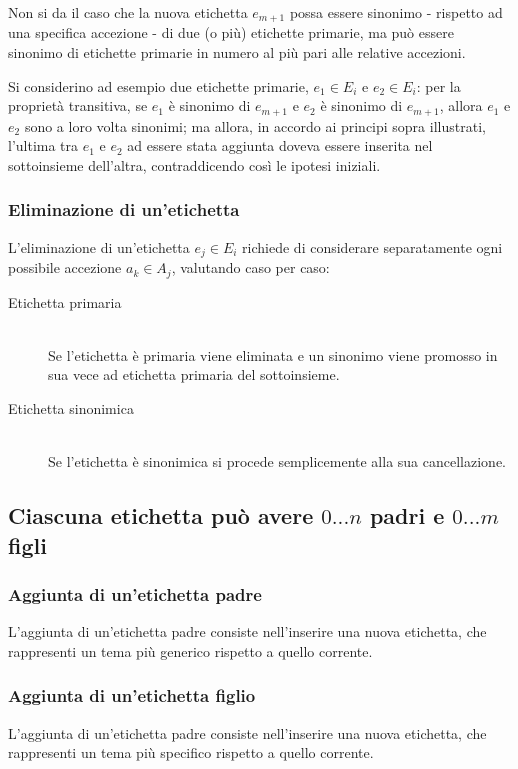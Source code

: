\documentclass[10pt,a4paper,headinclude,footinclude,hidelinks]{scrreprt} %
\begin{document}
	Non si da il caso che la nuova etichetta $e_{m+1}$ possa essere sinonimo - rispetto ad una specifica accezione - di due (o più) etichette primarie, ma può essere sinonimo di etichette primarie in numero al più pari alle relative accezioni.

	Si considerino ad esempio due etichette primarie, $e_1 \in E_i$ e $e_2 \in E_i$: per la proprietà transitiva, se $e_1$ è sinonimo di $e_{m+1}$ e $e_2$ è sinonimo di $e_{m+1}$, allora $e_1$ e $e_2$ sono a loro volta sinonimi; ma allora, in accordo ai principi sopra illustrati, l'ultima tra $e_1$ e $e_2$ ad essere stata aggiunta doveva essere inserita nel sottoinsieme dell'altra, contraddicendo così le ipotesi iniziali.

	\subsubsection{Eliminazione di un'etichetta}
	L'eliminazione di un'etichetta $e_j \in E_i$ richiede di considerare separatamente ogni possibile accezione $a_k \in A_j$, valutando caso per caso:
	\begin{description}
	\item[Etichetta primaria]\hfill \\
	Se l'etichetta è primaria viene eliminata e un sinonimo viene promosso in sua vece ad etichetta primaria del sottoinsieme.
 	\item[Etichetta sinonimica] \hfill \\
	Se l'etichetta è sinonimica si procede semplicemente alla sua cancellazione.
	\end{description}

	\subsection[Gerarchia]{Ciascuna etichetta può avere $0...n$ padri e $0...m$ figli}
	\subsubsection{Aggiunta di un'etichetta padre}
	L'aggiunta di un'etichetta padre consiste nell'inserire una nuova etichetta, che rappresenti un tema più generico rispetto a quello corrente.
	\subsubsection{Aggiunta di un'etichetta figlio}
	L'aggiunta di un'etichetta padre consiste nell'inserire una nuova etichetta, che rappresenti un tema più specifico rispetto a quello corrente.
\end{document}
